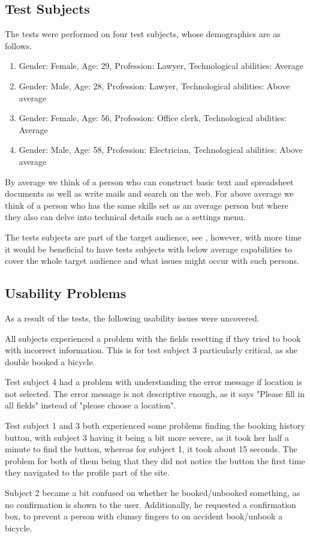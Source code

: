 \subsection{Test Subjects}
The tests were performed on four test subjects, whose demographics are as follows.
\begin{enumerate}
\item Gender: Female, Age: 29, Profession: Lawyer, Technological abilities: Average
\item Gender: Male, Age: 28, Profession: Lawyer, Technological abilities: Above average
\item Gender: Female, Age: 56, Profession: Office clerk, Technological abilities: Average
\item Gender: Male, Age: 58, Profession: Electrician, Technological abilities: Above average
\end{enumerate}

By average we think of a person who can construct basic text and spreadsheet documents as well as write mails and search on the web.
For above average we think of a person who has the same skills set as an average person but where they also can delve into technical details such as a settings menu.

The tests subjects are part of the target audience, see , however, with more time it would be beneficial to have tests subjects with below average capabilities to cover the whole target audience and what issues might occur with such persons.
\subsection{Usability Problems}
As a result of the tests, the following usability issues were uncovered.

\begin{description}[style=nextline]
	\item[{\#}1 Fields reset]
		All subjects experienced a problem with the fields resetting if they tried to book with incorrect information.
		This is for test subject 3 particularly critical, as she double booked a bicycle.
	\item[{\#}2 Error message understandability] Test subject 4 had a problem with understanding the error message if location is not selected.
	The error message is not descriptive enough, as it says "Please fill in all fields" instead of "please choose a location".
	\item[{\#}3 Difficulty finding history] Test subject 1 and 3 both experienced some problems finding the booking history button, with subject 3 having it being a bit more severe, as it took her half a minute to find the button, whereas for subject 1, it took about 15 seconds. 
	The problem for both of them being that they did not notice the button the first time they navigated to the profile part of the site.
	\item[{\#}4 Booking/Unbooking confirmation] Subject 2 became a bit confused on whether he booked/unbooked something, as no confirmation is shown to the user.
	Additionally, he requested a confirmation box, to prevent a person with clumsy fingers to on accident book/unbook a bicycle.
\end{description}

